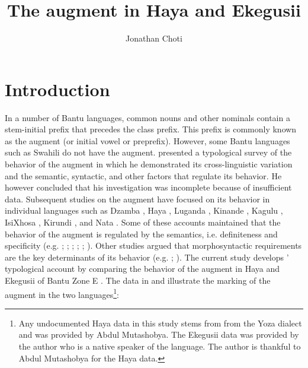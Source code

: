 \documentclass[output=paper]{langscibook}
\author{Jonathan Choti\affiliation{Michigan State University}}
\title{The augment in Haya and Ekegusii}
\begin{document}
\maketitle

\section{Introduction}
In a number of Bantu languages, common nouns and other nominals contain a stem-initial prefix that precedes the class prefix. This prefix is commonly known as the augment (or initial vowel or preprefix). However, some Bantu languages such as Swahili do not have the augment.  presented a typological survey of the behavior of the augment in which he demonstrated its cross-linguistic variation and the semantic, syntactic, and other factors that regulate its behavior. He however concluded that his investigation was incomplete because of insufficient data. Subsequent studies on the augment have focused on its behavior in individual languages such as Dzamba \citep{bokamba1971specificity}, Haya \citep{chagas1977}, Luganda  \citep{ashton1987luganda,hyman1993augment,ferrari2009,mould1974syntax}, Kinande \citep{progovac1993non}, Kagulu \citep{petzell2003function}, IsiXhosa \citep{visser2008definiteness}, Kirundi \citep{ndayiragije2012augment}, and Nata \citep{gambarage2013pre,gambarage2019belief}. Some of these accounts maintained that the behavior of the augment is regulated by the semantics, i.e. definiteness and specificity (e.g. \citealt{bleek1869comparative}; \citealt{bokamba1971specificity}; \citealt{gambarage2013pre,gambarage2019belief}; \citealt{givon1972studies}; \citealt{meeussen1959essai}; \citealt{mould1974syntax}). Other studies argued that morphosyntactic requirements are the key determinants of its behavior (e.g. \citealt{dewees1971role}; \citealt{hyman1993augment}). The current study develops \citeauthor{blois1970augment}’ typological account by comparing the behavior of the augment in Haya and Ekegusii of Bantu Zone E \citep{guthrie196771}. The data in  and  illustrate the marking of the augment in the two languages\footnote{Any undocumented Haya data in this study stems from from the Yoza dialect and was provided by Abdul Mutashobya. The Ekegusii data was provided by the author who is a native speaker of the language. The author is thankful to Abdul Mutashobya for the Haya data.}:
\end{document}
